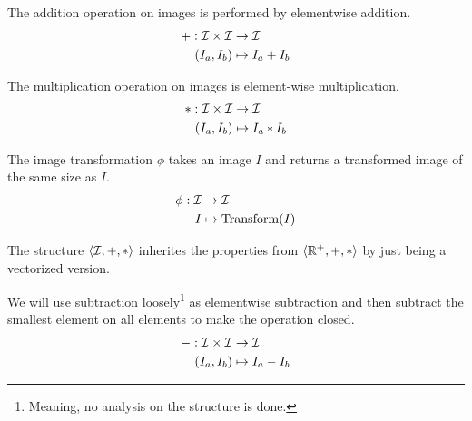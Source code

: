 \begin{definition}
  The addition operation on images is performed by elementwise
  addition.
  \begin{equation}
    \begin{split}
      + : \mathcal{I} \times \mathcal{I} &\rightarrow \mathcal{I}\\
      (I_a,I_b) &\mapsto I_a+I_b
    \end{split}
  \end{equation}
\end{definition}

\begin{definition}
  The multiplication operation on images is element-wise
  multiplication.
  \begin{equation}
    \begin{split}
      * : \mathcal{I} \times \mathcal{I} &\rightarrow \mathcal{I}\\
      (I_a,I_b) &\mapsto I_a*I_b
    \end{split}
  \end{equation}
\end{definition}

\begin{definition}
  The image transformation $\phi$ takes an image $I$ and returns a
  transformed image of the same size as $I$.
  \begin{equation}
    \begin{split}
      \phi : \mathcal{I} &\rightarrow \mathcal{I}\\
      I &\mapsto \text{Transform}(I)
    \end{split}
  \end{equation}
\end{definition}

The structure $\langle \mathcal{I},+,*\rangle$ inherites the properties from
$\langle \mathbb{R}^+,+,*\rangle$ by just being a vectorized version.

\begin{definition}
  We will use subtraction loosely\footnote{Meaning, no analysis on the
    structure is done.} as elementwise subtraction and then subtract
  the smallest element on all elements to make the operation closed.
  \begin{equation}
    \begin{split}
      - : \mathcal{I} \times \mathcal{I} &\rightarrow \mathcal{I}\\
      (I_a,I_b) &\mapsto I_a-I_b
    \end{split}
  \end{equation}
\end{definition}

